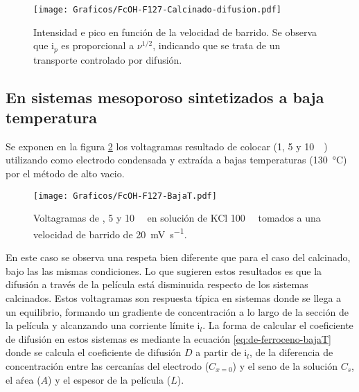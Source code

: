 		    \begin{figure}[ht]
				\centering
		 	    \texttt{[image: Graficos/FcOH-F127-Calcinado-difusion.pdf]}
		        \caption[i$_p$ en función de $\nu$ para \fc\space]{Intensidad e pico en función de la velocidad de barrido. Se observa que $\text{i}_p$ es proporcional a $\nu ^{1/2}$, indicando que se trata de un transporte controlado por difusión.}
		        \label{fig:difusion_calcinado}
		      	\end{figure}
	      	
	\subsection{En sistemas mesoporoso sintetizados a baja temperatura}

		Se exponen en la figura \ref{fig:fcoh_bajaT} los voltagramas resultado de colocar \fc\space (1, 5 y \SI{10}{\milli\Molar}) utilizando como electrodo \pdmF\space condensada y extraída a bajas temperaturas (\SI{130}{\celsius}) por el método de alto vacio. 
			\begin{figure}[ht]
				\centering
		 	    \texttt{[image: Graficos/FcOH-F127-BajaT.pdf]}
		        \caption[Voltagrama para \fc\space en \pdm\space de baja temperatura]{Voltagramas de \fc{}, 5 y \SI{10}{\milli\Molar} en solución de KCl \SI{100}{\milli\Molar} tomados a una velocidad de barrido de \SI{20}{\milli\volt\per\second}.}
		        \label{fig:fcoh_bajaT}
		      	\end{figure}
		
		En este caso se observa una respeta bien diferente que para el caso del calcinado, bajo las las mismas condiciones. Lo que sugieren estos resultados es que la difusión a través de la película está disminuida respecto de los sistemas calcinados. Estos voltagramas son respuesta típica en sistemas donde se llega a un equilibrio, formando un gradiente de concentración a lo largo de la sección de la película y alcanzando una corriente límite $\text{i}_l$. 
		La forma de calcular el coeficiente de difusión en estos sistemas es mediante la ecuación \ref{eq:de-ferroceno-bajaT} donde se calcula el coeficiente de difusión $D$ a partir de $\text{i}_l$, de la diferencia de concentración entre las cercanías del electrodo ($C_{x=0}$) y el seno de la solución $C_s$, el aŕea ($A$) y el espesor de la película ($L$).

